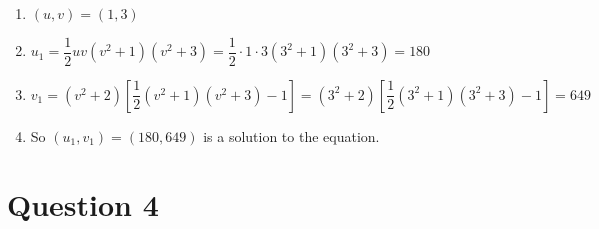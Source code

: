 \documentclass{article}
\begin{document}
~

\begin{enumerate}
    \item $(u,v)=(1,3)$
    \item $u_1=\dfrac{1}{2}uv(v^2+1)(v^2+3)=\dfrac{1}{2}\cdot 1\cdot 3(3^2+1)(3^2+3)=180$
    \item $v_1=(v^2+2)\left[\dfrac{1}{2}(v^2+1)(v^2+3)-1\right]=(3^2+2)\left[\dfrac{1}{2}(3^2+1)(3^2+3)-1\right]=649$
    \item So $(u_1,v_1)=(180,649)$ is a solution to the equation.
\end{enumerate}

\newpage

\section*{Question 4}

~
\end{document}
